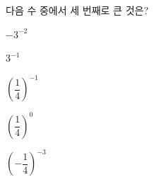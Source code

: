 다음 수 중에서 세 번째로 큰 것은?
\begin{choices32}{\rule[-3ex]{0pt}{8ex}$-3^{-2}$}{\rule[-3ex]{0pt}{8ex}$3^{-1}$}{\rule[-3ex]{0pt}{8ex}$\left(\dfrac{1}{4}\right)^{-1}$}{\rule[-3ex]{0pt}{8ex}$\left(\dfrac{1}{4}\right)^{0}$}{\rule[-3ex]{0pt}{8ex}$\left(-\dfrac{1}{4}\right)^{-3}$}\end{choices32}
